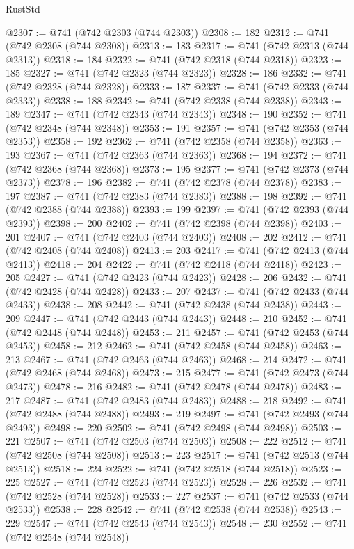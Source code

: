 \begin{lexlean}{RustStd}
\begin{coremodule}
{\begin{coremodule}
{{{{{{{{{{{{{{{{{{{{{{{{{{{{{{{{{{{{{{{{{{{{{@2307 := @741 (@742 @2303 (@744 @2303))
@2308 := 182
@2312 := @741 (@742 @2308 (@744 @2308))
@2313 := 183
@2317 := @741 (@742 @2313 (@744 @2313))
@2318 := 184
@2322 := @741 (@742 @2318 (@744 @2318))
@2323 := 185
@2327 := @741 (@742 @2323 (@744 @2323))
@2328 := 186
@2332 := @741 (@742 @2328 (@744 @2328))
@2333 := 187
@2337 := @741 (@742 @2333 (@744 @2333))
@2338 := 188
@2342 := @741 (@742 @2338 (@744 @2338))
@2343 := 189
@2347 := @741 (@742 @2343 (@744 @2343))
@2348 := 190
@2352 := @741 (@742 @2348 (@744 @2348))
@2353 := 191
@2357 := @741 (@742 @2353 (@744 @2353))
@2358 := 192
@2362 := @741 (@742 @2358 (@744 @2358))
@2363 := 193
@2367 := @741 (@742 @2363 (@744 @2363))
@2368 := 194
@2372 := @741 (@742 @2368 (@744 @2368))
@2373 := 195
@2377 := @741 (@742 @2373 (@744 @2373))
@2378 := 196
@2382 := @741 (@742 @2378 (@744 @2378))
@2383 := 197
@2387 := @741 (@742 @2383 (@744 @2383))
@2388 := 198
@2392 := @741 (@742 @2388 (@744 @2388))
@2393 := 199
@2397 := @741 (@742 @2393 (@744 @2393))
@2398 := 200
@2402 := @741 (@742 @2398 (@744 @2398))
@2403 := 201
@2407 := @741 (@742 @2403 (@744 @2403))
@2408 := 202
@2412 := @741 (@742 @2408 (@744 @2408))
@2413 := 203
@2417 := @741 (@742 @2413 (@744 @2413))
@2418 := 204
@2422 := @741 (@742 @2418 (@744 @2418))
@2423 := 205
@2427 := @741 (@742 @2423 (@744 @2423))
@2428 := 206
@2432 := @741 (@742 @2428 (@744 @2428))
@2433 := 207
@2437 := @741 (@742 @2433 (@744 @2433))
@2438 := 208
@2442 := @741 (@742 @2438 (@744 @2438))
@2443 := 209
@2447 := @741 (@742 @2443 (@744 @2443))
@2448 := 210
@2452 := @741 (@742 @2448 (@744 @2448))
@2453 := 211
@2457 := @741 (@742 @2453 (@744 @2453))
@2458 := 212
@2462 := @741 (@742 @2458 (@744 @2458))
@2463 := 213
@2467 := @741 (@742 @2463 (@744 @2463))
@2468 := 214
@2472 := @741 (@742 @2468 (@744 @2468))
@2473 := 215
@2477 := @741 (@742 @2473 (@744 @2473))
@2478 := 216
@2482 := @741 (@742 @2478 (@744 @2478))
@2483 := 217
@2487 := @741 (@742 @2483 (@744 @2483))
@2488 := 218
@2492 := @741 (@742 @2488 (@744 @2488))
@2493 := 219
@2497 := @741 (@742 @2493 (@744 @2493))
@2498 := 220
@2502 := @741 (@742 @2498 (@744 @2498))
@2503 := 221
@2507 := @741 (@742 @2503 (@744 @2503))
@2508 := 222
@2512 := @741 (@742 @2508 (@744 @2508))
@2513 := 223
@2517 := @741 (@742 @2513 (@744 @2513))
@2518 := 224
@2522 := @741 (@742 @2518 (@744 @2518))
@2523 := 225
@2527 := @741 (@742 @2523 (@744 @2523))
@2528 := 226
@2532 := @741 (@742 @2528 (@744 @2528))
@2533 := 227
@2537 := @741 (@742 @2533 (@744 @2533))
@2538 := 228
@2542 := @741 (@742 @2538 (@744 @2538))
@2543 := 229
@2547 := @741 (@742 @2543 (@744 @2543))
@2548 := 230
@2552 := @741 (@742 @2548 (@744 @2548))
}}}}}}}}}}}}}}}}}}}}}}}}}}}}}}}}}}}}}}}}}}}}}
\end{coremodule}}
\end{coremodule}
\end{lexlean}
